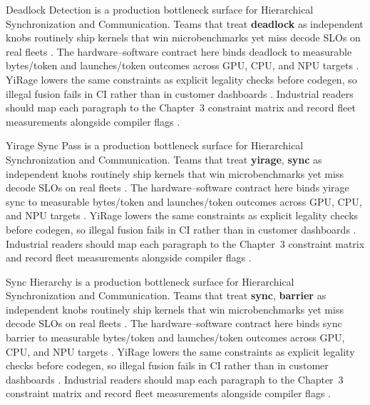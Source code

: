 Deadlock Detection is a production bottleneck surface for Hierarchical Synchronization and Communication. Teams that treat \textbf{deadlock} as independent knobs routinely ship kernels that win microbenchmarks yet miss decode SLOs on real fleets \citep{memoryfloor2026,amd2024xdna}. The hardware--software contract here binds deadlock to measurable bytes/token and launches/token outcomes across GPU, CPU, and NPU targets \citep{nvidia2022hopper,amd2024aie}. YiRage lowers the same constraints as explicit legality checks before codegen, so illegal fusion fails in CI rather than in customer dashboards \citep{semianalysis2024tma,dlbook}. Industrial readers should map each paragraph to the Chapter~3 constraint matrix and record fleet measurements alongside compiler flags \citep{amd2024xdna,dao2022flashattention}.

Yirage Sync Pass is a production bottleneck surface for Hierarchical Synchronization and Communication. Teams that treat \textbf{yirage}, \textbf{sync} as independent knobs routinely ship kernels that win microbenchmarks yet miss decode SLOs on real fleets \citep{nvidia2022hopper,amd2024aie}. The hardware--software contract here binds yirage sync to measurable bytes/token and launches/token outcomes across GPU, CPU, and NPU targets \citep{semianalysis2024tma,dlbook}. YiRage lowers the same constraints as explicit legality checks before codegen, so illegal fusion fails in CI rather than in customer dashboards \citep{amd2024xdna,dao2022flashattention}. Industrial readers should map each paragraph to the Chapter~3 constraint matrix and record fleet measurements alongside compiler flags \citep{amd2024aie,kwon2023vllm}.

Sync Hierarchy is a production bottleneck surface for Hierarchical Synchronization and Communication. Teams that treat \textbf{sync}, \textbf{barrier} as independent knobs routinely ship kernels that win microbenchmarks yet miss decode SLOs on real fleets \citep{semianalysis2024tma,dlbook}. The hardware--software contract here binds sync barrier to measurable bytes/token and launches/token outcomes across GPU, CPU, and NPU targets \citep{amd2024xdna,dao2022flashattention}. YiRage lowers the same constraints as explicit legality checks before codegen, so illegal fusion fails in CI rather than in customer dashboards \citep{amd2024aie,kwon2023vllm}. Industrial readers should map each paragraph to the Chapter~3 constraint matrix and record fleet measurements alongside compiler flags \citep{dlbook,nvidia2024cudagraphs}.

